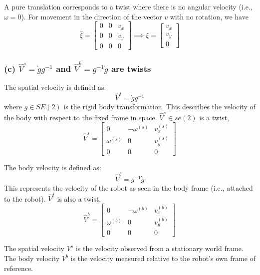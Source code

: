 A pure translation corresponds to a twist where there is no angular velocity (i.e., \( \omega = 0 \)).
For movement in the direction of the vector \( v \) with no rotation, we have
\[
    \hat{\xi} = \begin{bmatrix}
        0 & 0 & v_x \\
        0 & 0 & v_y \\
        0 & 0 & 0
    \end{bmatrix}
    \implies
    \xi = \begin{bmatrix}
        v_x \\
        v_y \\
        0
    \end{bmatrix}
\]

\clearpage
\subsubsection*{(c) \( \hat{V}^{s} = \dot{g} g^{-1} \) and \( \hat{V}^{b} = g^{-1} \dot{g} \) are twists}

The spatial velocity is defined as:
\[
    \hat{V}^{s} = \dot{g} g^{-1}
\]
where \( g \in SE(2) \) is the rigid body transformation.
This describes the velocity of the body with respect to the fixed frame in space.
\( \hat{V}^{s} \in se(2) \) is a twist,
\[
    \hat{V}^{s} = \begin{bmatrix}
        0            & -\omega^{(s)} & v_x^{(s)} \\
        \omega^{(s)} & 0             & v_y^{(s)} \\
        0            & 0             & 0
    \end{bmatrix}
\]

The body velocity is defined as:
\[
    \hat{V}^{b} = g^{-1} \dot{g}
\]
This represents the velocity of the robot as seen in the body frame (i.e., attached to the robot).
\( \hat{V}^{s} \) is also a twist,
\[
    \hat{V}^{b} = \begin{bmatrix}
        0            & -\omega^{(b)} & v_x^{(b)} \\
        \omega^{(b)} & 0             & v_y^{(b)} \\
        0            & 0             & 0
    \end{bmatrix}
\]

The spatial velocity \( V^s \) is the velocity observed from a stationary world frame.
The body velocity \( V^b \) is the velocity measured relative to the robot's own frame of reference.
